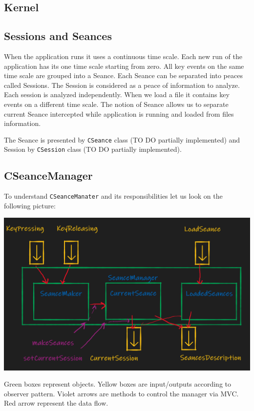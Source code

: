 \documentclass{article}
\begin{document}
\subsection{Kernel}


\subsection{Sessions and Seances}

When the application runs it uses a continuous time scale. Each new run of the application has its one time scale starting from zero. All key events on the same time scale are grouped into a Seance. Each Seance can be separated into peaces called Sessions. The Session is considered as a peace of information to analyze. Each session is analyzed independently. When we load a file it contains key events on a different time scale. The notion of Seance allows us to separate current Seance intercepted while application is running and loaded from files information.

The Seance is presented by \verb"CSeance" class (TO DO partially implemented) and Session by \verb"CSession" class (TO DO partially implemented).


\subsection{CSeanceManager}

To understand \verb"CSeanceManater" and its responsibilities let us look on the following picture:
\begin{center}
\includegraphics[scale = 0.4]{Figures/SeanceManager.png}

Green boxes represent objects. Yellow boxes are input/outputs according to observer pattern. Violet arrows are methods to control the manager via MVC. Red arrow represent the data flow.
\end{center}
\end{document}

